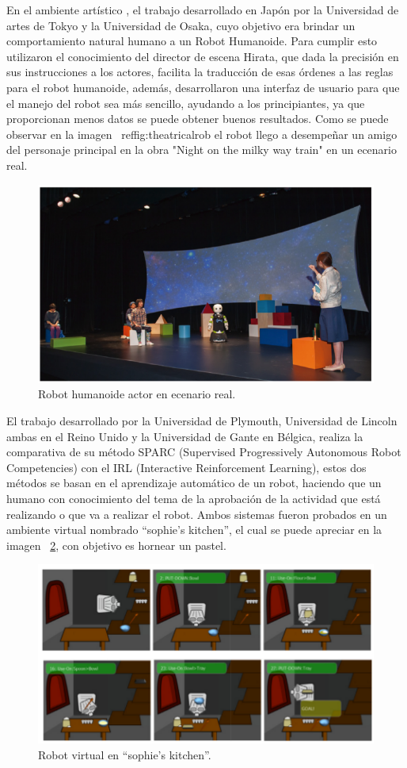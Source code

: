 En el ambiente artístico \cite{Nishiguchi2017}, el trabajo desarrollado en
 Japón por la Universidad de artes de Tokyo y la Universidad de Osaka, cuyo
 objetivo era brindar un comportamiento natural humano a un Robot Humanoide.
 Para cumplir esto utilizaron el conocimiento del director de escena Hirata,
 que dada la precisión en sus instrucciones a los actores, facilita la
 traducción de esas órdenes a las reglas para el robot humanoide, además,
 desarrollaron una interfaz de usuario para que el manejo del robot sea más
 sencillo, ayudando a los principiantes, ya que proporcionan menos datos se
 puede obtener buenos resultados. Como se puede observar en la imagen
 ~ref{fig:theatricalrob} el robot llego a desempeñar un amigo del
 personaje principal en la obra "Night on the milky way train" en un ecenario
 real.


\begin{figure}[H]
\centering
\includegraphics[width=0.8\columnwidth]{CapituloI/Imagenes/Theatrical.png}
\caption{Robot humanoide actor en ecenario real.}
\label{fig:theatricalrob}
\end{figure} 


El trabajo desarrollado por la Universidad de Plymouth, Universidad de Lincoln
 ambas en el Reino Unido y la Universidad de Gante en Bélgica\cite{Senft2016},
 realiza la comparativa de su método SPARC (Supervised Progressively Autonomous
 Robot Competencies) con el IRL (Interactive Reinforcement Learning), estos dos
 métodos se basan en el aprendizaje automático de un robot, haciendo que un
 humano con conocimiento del tema de la aprobación de la actividad que está
 realizando o que va a realizar el robot. Ambos sistemas fueron probados en un
 ambiente virtual nombrado “sophie’s kitchen”, el cual se puede apreciar en la
 imagen ~\ref{fig:sparcrob}, con objetivo es hornear un pastel.
 
 
\begin{figure}[H]
\centering
\includegraphics[width=0.8\columnwidth]{CapituloI/Imagenes/Sparc.png}
\caption{Robot virtual en “sophie’s kitchen”.}
\label{fig:sparcrob}
\end{figure}



